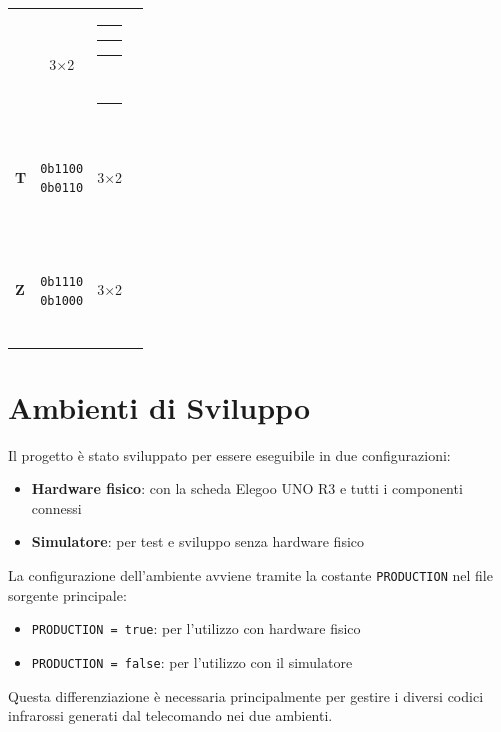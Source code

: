 \documentclass[a4paper, 12pt]{article}
\newcommand{\RedBlock}{\colorbox{red}{\rule{1.2ex}{1.2ex}}}      %
\newcommand{\WhiteBlock}{\fcolorbox{black}{white}{\rule{1.2ex}{1.2ex}}} %
\begin{document}
\begin{table}[H]
\begin{tabular}{
            >{\bfseries}l   %
            c               %
            c               %
            l               %
        }
              & 3\(\times\)2
              & \makecell{\WhiteBlock\RedBlock\RedBlock\RedBlock                          \\\WhiteBlock\WhiteBlock\RedBlock\WhiteBlock} \\
        \addlinespace
        T     & \makecell{\texttt{0b1100}                                                 \\\texttt{0b0110}}
              & 3\(\times\)2
              & \makecell{\RedBlock\RedBlock\WhiteBlock\WhiteBlock                        \\\WhiteBlock\RedBlock\RedBlock\WhiteBlock} \\
        \addlinespace
        Z     & \makecell{\texttt{0b1110}                                                 \\\texttt{0b1000}}
              & 3\(\times\)2
              & \makecell{\RedBlock\RedBlock\RedBlock\WhiteBlock                          \\\RedBlock\WhiteBlock\WhiteBlock\WhiteBlock} \\
        \bottomrule
    \end{tabular}
\end{table}

\section{Ambienti di Sviluppo}
\label{sec:ambienti}
Il progetto è stato sviluppato per essere eseguibile in due configurazioni:
\begin{itemize}
    \item \textbf{Hardware fisico}: con la scheda Elegoo UNO R3 e tutti i componenti connessi
    \item \textbf{Simulatore}: per test e sviluppo senza hardware fisico
\end{itemize}

La configurazione dell'ambiente avviene tramite la costante \texttt{PRODUCTION} nel file sorgente principale:
\begin{itemize}
    \item \texttt{PRODUCTION = true}: per l'utilizzo con hardware fisico
    \item \texttt{PRODUCTION = false}: per l'utilizzo con il simulatore
\end{itemize}

Questa differenziazione è necessaria principalmente per gestire i diversi codici infrarossi generati dal telecomando nei due ambienti.
\end{document}
